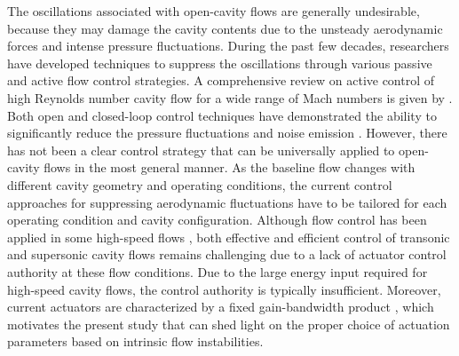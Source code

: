 \documentclass{jfm}
\begin{document}
The oscillations associated with open-cavity flows are generally undesirable, because they may damage the cavity contents due to the unsteady aerodynamic forces and intense pressure fluctuations. During the past few decades, researchers have developed techniques to suppress the oscillations through various passive and active flow control strategies. A comprehensive review on active control of high Reynolds number cavity flow for a wide range of Mach numbers is given by \cite{Cattafesta:PAS08}. Both open and closed-loop control techniques have demonstrated the ability to significantly reduce the pressure fluctuations and noise emission \citep{Samimy:JFM07, Cattafesta:PAS08, Zhang:AIAA15, Lusk:EF12}. However, there has not been a clear control strategy that can be universally applied to open-cavity flows in the most general manner. As the baseline flow changes with different cavity geometry and operating conditions, the current control approaches for suppressing aerodynamic fluctuations have to be tailored for each operating condition and cavity configuration. Although flow control has been applied in some high-speed flows \citep{Cattafesta:PAS08, Cattafesta:ARFM11}, both effective and efficient control of transonic and supersonic cavity flows remains challenging due to a lack of actuator control authority at these flow conditions. Due to the large energy input required for high-speed cavity flows, the control authority is typically insufficient. Moreover, current actuators are characterized by a fixed gain-bandwidth product \citep{Cattafesta:ARFM11}, which  motivates the present study that can shed light on the proper choice of actuation parameters based on intrinsic flow instabilities.

\end{document}
